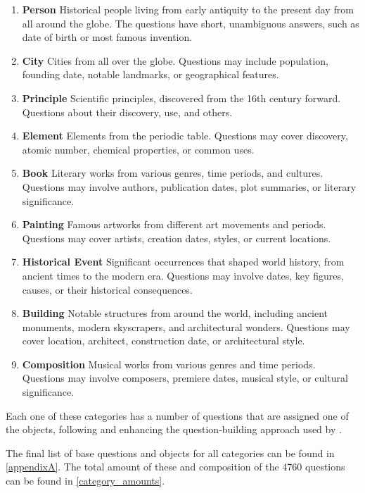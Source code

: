 \begin{enumerate}
	\item \textbf{Person} Historical people living from early antiquity to the present day from all around the globe. The questions have short, unambiguous answers, such as date of birth or most famous invention.
	\item \textbf{City} Cities from all over the globe. Questions may include population, founding date, notable landmarks, or geographical features.
	\item \textbf{Principle} Scientific principles, discovered from the 16th century forward. Questions about their discovery, use, and others.
	\item \textbf{Element} Elements from the periodic table. Questions may cover discovery, atomic number, chemical properties, or common uses.
	\item \textbf{Book} Literary works from various genres, time periods, and cultures. Questions may involve authors, publication dates, plot summaries, or literary significance.
	\item \textbf{Painting} Famous artworks from different art movements and periods. Questions may cover artists, creation dates, styles, or current locations.
	\item \textbf{Historical Event} Significant occurrences that shaped world history, from ancient times to the modern era. Questions may involve dates, key figures, causes, or their historical consequences.
	\item \textbf{Building} Notable structures from around the world, including ancient monuments, modern skyscrapers, and architectural wonders. Questions may cover location, architect, construction date, or architectural style.
	\item \textbf{Composition} Musical works from various genres and time periods. Questions may involve composers, premiere dates, musical style, or cultural significance.
\end{enumerate}

Each one of these categories has a number of questions that are assigned one of the objects, following and enhancing the question-building approach used by \citeauthor{factual_recall}.

The final list of base questions and objects for all categories can be found in \cref{appendixA}.
The total amount of these and composition of the 4760 questions can be found in \cref{category_amounts}.

